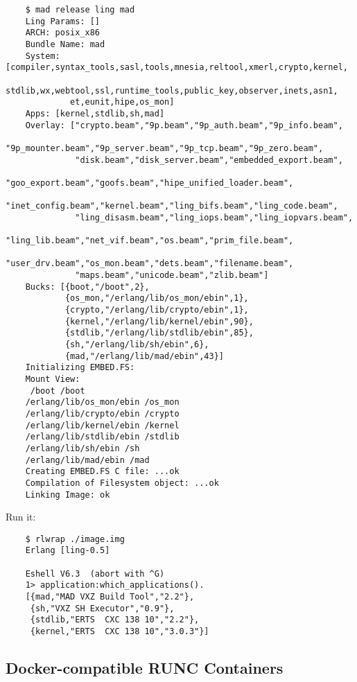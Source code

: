 \vspace{1\baselineskip}
\begin{lstlisting}
    $ mad release ling mad
    Ling Params: []
    ARCH: posix_x86
    Bundle Name: mad
    System: [compiler,syntax_tools,sasl,tools,mnesia,reltool,xmerl,crypto,kernel,
             stdlib,wx,webtool,ssl,runtime_tools,public_key,observer,inets,asn1,
             et,eunit,hipe,os_mon]
    Apps: [kernel,stdlib,sh,mad]
    Overlay: ["crypto.beam","9p.beam","9p_auth.beam","9p_info.beam",
              "9p_mounter.beam","9p_server.beam","9p_tcp.beam","9p_zero.beam",
              "disk.beam","disk_server.beam","embedded_export.beam",
              "goo_export.beam","goofs.beam","hipe_unified_loader.beam",
              "inet_config.beam","kernel.beam","ling_bifs.beam","ling_code.beam",
              "ling_disasm.beam","ling_iops.beam","ling_iopvars.beam",
              "ling_lib.beam","net_vif.beam","os.beam","prim_file.beam",
              "user_drv.beam","os_mon.beam","dets.beam","filename.beam",
              "maps.beam","unicode.beam","zlib.beam"]
    Bucks: [{boot,"/boot",2},
            {os_mon,"/erlang/lib/os_mon/ebin",1},
            {crypto,"/erlang/lib/crypto/ebin",1},
            {kernel,"/erlang/lib/kernel/ebin",90},
            {stdlib,"/erlang/lib/stdlib/ebin",85},
            {sh,"/erlang/lib/sh/ebin",6},
            {mad,"/erlang/lib/mad/ebin",43}]
    Initializing EMBED.FS:
    Mount View:
     /boot /boot
    /erlang/lib/os_mon/ebin /os_mon
    /erlang/lib/crypto/ebin /crypto
    /erlang/lib/kernel/ebin /kernel
    /erlang/lib/stdlib/ebin /stdlib
    /erlang/lib/sh/ebin /sh
    /erlang/lib/mad/ebin /mad
    Creating EMBED.FS C file: ...ok
    Compilation of Filesystem object: ...ok
    Linking Image: ok
\end{lstlisting}
\vspace{1\baselineskip}

Run it:

\vspace{1\baselineskip}
\begin{lstlisting}
    $ rlwrap ./image.img
    Erlang [ling-0.5]

    Eshell V6.3  (abort with ^G)
    1> application:which_applications().
    [{mad,"MAD VXZ Build Tool","2.2"},
     {sh,"VXZ SH Executor","0.9"},
     {stdlib,"ERTS  CXC 138 10","2.2"},
     {kernel,"ERTS  CXC 138 10","3.0.3"}]
\end{lstlisting}
\vspace{1\baselineskip}

\subsection{Docker-compatible RUNC Containers}

